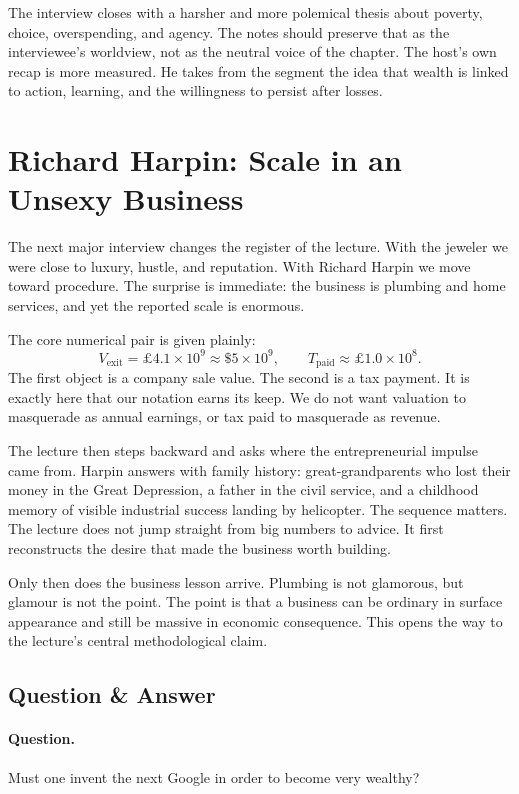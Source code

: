 The interview closes with a harsher and more polemical thesis about poverty, choice, overspending, and agency. The notes should preserve that as the interviewee's worldview, not as the neutral voice of the chapter. The host's own recap is more measured. He takes from the segment the idea that wealth is linked to action, learning, and the willingness to persist after losses.

\section{Richard Harpin: Scale in an Unsexy Business}

The next major interview changes the register of the lecture. With the jeweler we were close to luxury, hustle, and reputation. With Richard Harpin we move toward procedure. The surprise is immediate: the business is plumbing and home services, and yet the reported scale is enormous.

The core numerical pair is given plainly:
\begin{equation}
V_{\mathrm{exit}}=\pounds 4.1\times 10^9 \approx \$5\times 10^9,
\qquad
T_{\mathrm{paid}} \approx \pounds 1.0\times 10^8.
\end{equation}
The first object is a company sale value. The second is a tax payment. It is exactly here that our notation earns its keep. We do not want valuation to masquerade as annual earnings, or tax paid to masquerade as revenue.

The lecture then steps backward and asks where the entrepreneurial impulse came from. Harpin answers with family history: great-grandparents who lost their money in the Great Depression, a father in the civil service, and a childhood memory of visible industrial success landing by helicopter. The sequence matters. The lecture does not jump straight from big numbers to advice. It first reconstructs the desire that made the business worth building.

Only then does the business lesson arrive. Plumbing is not glamorous, but glamour is not the point. The point is that a business can be ordinary in surface appearance and still be massive in economic consequence. This opens the way to the lecture's central methodological claim.

\subsection{Question \& Answer}

\paragraph{Question.} Must one invent the next Google in order to become very wealthy?


